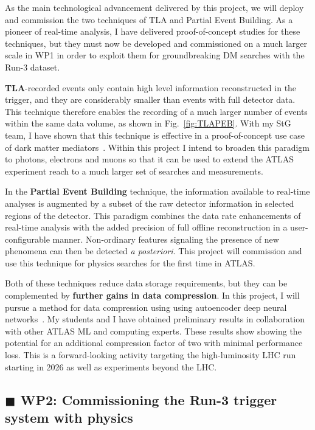 \documentclass[11pt,a4paper]{article}
\begin{document}
As the main technological advancement delivered by this project, we will deploy and commission the two techniques of TLA and Partial Event Building. 
As a pioneer of real-time analysis, I have delivered proof-of-concept studies for these techniques, but they must now be developed and commissioned on a much larger scale in WP1 in order to exploit them for groundbreaking DM searches with the Run-3 dataset.

\textbf{TLA}-recorded events only contain high level information reconstructed in the trigger, and they are considerably smaller than events with full detector data. 
This technique therefore enables the recording of a much larger number of events within the same data volume, as shown in Fig.~\ref{fig:TLAPEB}.  
With my StG team, I have shown that this technique is effective in a proof-of-concept use case of dark matter mediators~\cite{Aaboud:2018fzt}. 
Within this project I intend to broaden this paradigm to photons, electrons and muons so that it can be used to extend the ATLAS experiment reach to a much larger set of searches and measurements. 

In the \textbf{Partial Event Building} technique, the information available to real-time analyses is augmented by a subset of the raw detector information in selected regions of the detector. This paradigm combines the data rate enhancements of real-time analysis with the added precision of full offline reconstruction in a user-configurable manner. 
Non-ordinary features signaling the presence of new phenomena can then be detected \textit{a posteriori}. 
This project will commission and use this technique for physics searches for the first time in ATLAS. 

Both of these techniques reduce data storage requirements, but they can be complemented by \textbf{further gains in data compression}. 
In this project, I will pursue a method for data compression using using autoencoder deep neural networks~\cite{Autoencoders}. %
My students and I have obtained preliminary results in collaboration with other ATLAS ML and computing experts.
These results show showing the potential for an additional compression factor of two with minimal performance loss. 
This is a forward-looking activity targeting the high-luminosity LHC run starting in 2026 as well as experiments beyond the LHC.

\subsection*{\color{green} $\blacksquare$ \color{black} WP2: Commissioning the Run-3 trigger system with physics}
\end{document}
